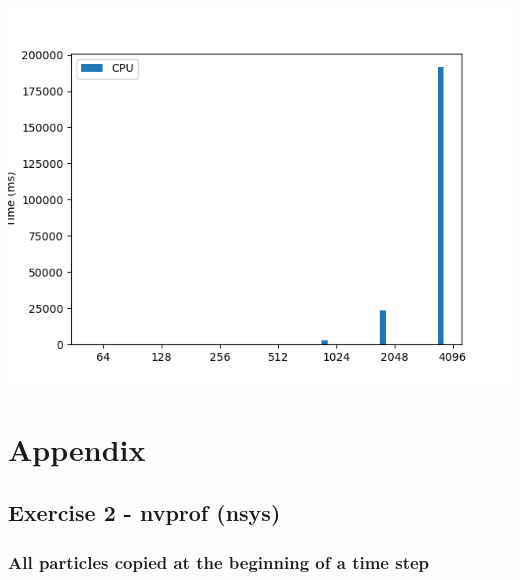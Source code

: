 \documentclass[english]{exam}
\begin{document}
\begin{enumerate}
  \begin{center}
    \includegraphics[scale=0.65]{gpu3.png}
  \end{center}

  
\end{enumerate}

\clearpage
\chapter{Appendix}
\section*{Exercise 2 - nvprof (nsys)}


\subsection*{All particles copied at the beginning of a time step}
\end{document}
